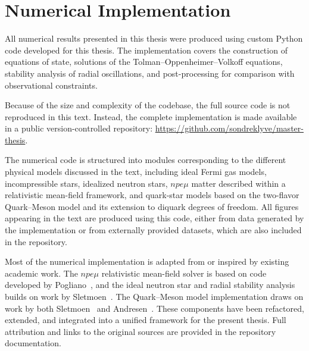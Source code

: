 \chapter{Numerical Implementation}
\label{app:code}

All numerical results presented in this thesis were produced using
custom Python code developed for this thesis.
The implementation covers the construction of equations of state,
solutions of the Tolman--Oppenheimer--Volkoff equations, stability
analysis of radial oscillations, and post-processing for comparison
with observational constraints.

Because of the size and complexity of the codebase, the full source code
is not reproduced in this text. Instead, the complete implementation
is made available in a public version-controlled repository:
\url{https://github.com/sondreklyve/master-thesis}.

The numerical code is structured into modules corresponding to the
different physical models discussed in the text, including ideal
Fermi gas models, incompressible stars, idealized neutron stars,
$npe\mu$ matter described within a relativistic mean-field framework,
and quark-star models based on the two-flavor Quark--Meson model and
its extension to diquark degrees of freedom.
All figures appearing in the text are produced using this code, either
from data generated by the implementation or from externally provided datasets,
which are also included in the repository.

Most of the numerical implementation is adapted from or inspired by existing
academic work. The $npe\mu$ relativistic mean-field
solver is based on code developed by Pogliano~\cite{pogliano2017},
and the ideal neutron star and radial stability analysis builds on work by
Sletmoen~\cite{sletmoen2022}.
The Quark--Meson model implementation draws on work by both
Sletmoen~\cite{sletmoen2022} and Andresen~\cite{andresen2023}.
These components have been refactored,
extended, and integrated into a unified framework for the present
thesis. Full attribution and links to the original sources are
provided in the repository documentation.
